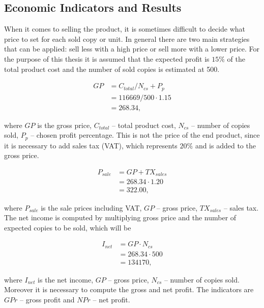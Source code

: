 \subsection{Economic Indicators and Results}

When it comes to selling the product, it is sometimes difficult to decide what
price to set for each sold copy or unit. In general there are two main
strategies that can be applied: sell less with a high price or sell more with a
lower price. For the purpose of this thesis it is assumed that the expected
profit is $15\%$ of the total product cost and the number of sold copies is
estimated at 500.

\begin{equation}
\begin{split}
GP &= C_{total} / N_{cs} + P_{p}\\
    &= 116669/500 \cdot 1.15 \\
    &= 268.34,
\end{split}
\end{equation}

\noindent where $GP$ is the gross price, $C_{total}$ -- total product cost,
$N_{cs}$ -- number of copies sold, $P_{p}$ -- chosen profit percentage. This
is not the price of the end product, since it is necessary to add sales tax
(VAT), which represents $20\%$ and is added to the gross price.

\begin{equation}
\begin{split}
P_{sale} &= GP + TX_{sales}\\
            &= 268.34 \cdot 1.20 \\
            &= 322.00,
\end{split}
\end{equation}

\noindent where $P_{sale}$ is the sale prices including VAT, $GP$ -- gross
price, $TX_{sales}$ -- sales tax. The net income is computed by multiplying
gross price and the number of expected copies to be sold, which will be

\begin{equation}
\begin{split}
I_{net} &= GP \cdot N_{cs}\\
        &= 268.34 \cdot 500 \\
        &= 134170,
\end{split}
\end{equation}

\noindent where $I_{net}$ is the net income, $GP$ -- gross price, $N_{cs}$ --
number of copies sold. Moreover it is necessary to compute the gross and net
profit. The indicators are $GPr$ -- gross profit and $NPr$ -- net profit.

